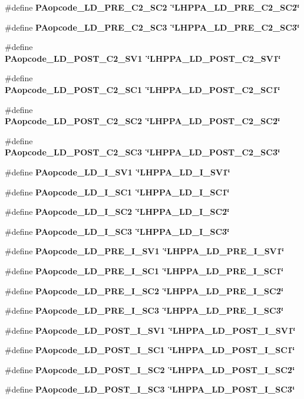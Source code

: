 \begin{CompactItemize}
\#define \bf{PAopcode\_\-LD\_\-PRE\_\-C2\_\-SC2}~\char`\"{}LHPPA\_\-LD\_\-PRE\_\-C2\_\-SC2\char`\"{}
\item 
\#define \bf{PAopcode\_\-LD\_\-PRE\_\-C2\_\-SC3}~\char`\"{}LHPPA\_\-LD\_\-PRE\_\-C2\_\-SC3\char`\"{}
\item 
\#define \bf{PAopcode\_\-LD\_\-POST\_\-C2\_\-SV1}~\char`\"{}LHPPA\_\-LD\_\-POST\_\-C2\_\-SV1\char`\"{}
\item 
\#define \bf{PAopcode\_\-LD\_\-POST\_\-C2\_\-SC1}~\char`\"{}LHPPA\_\-LD\_\-POST\_\-C2\_\-SC1\char`\"{}
\item 
\#define \bf{PAopcode\_\-LD\_\-POST\_\-C2\_\-SC2}~\char`\"{}LHPPA\_\-LD\_\-POST\_\-C2\_\-SC2\char`\"{}
\item 
\#define \bf{PAopcode\_\-LD\_\-POST\_\-C2\_\-SC3}~\char`\"{}LHPPA\_\-LD\_\-POST\_\-C2\_\-SC3\char`\"{}
\item 
\#define \bf{PAopcode\_\-LD\_\-I\_\-SV1}~\char`\"{}LHPPA\_\-LD\_\-I\_\-SV1\char`\"{}
\item 
\#define \bf{PAopcode\_\-LD\_\-I\_\-SC1}~\char`\"{}LHPPA\_\-LD\_\-I\_\-SC1\char`\"{}
\item 
\#define \bf{PAopcode\_\-LD\_\-I\_\-SC2}~\char`\"{}LHPPA\_\-LD\_\-I\_\-SC2\char`\"{}
\item 
\#define \bf{PAopcode\_\-LD\_\-I\_\-SC3}~\char`\"{}LHPPA\_\-LD\_\-I\_\-SC3\char`\"{}
\item 
\#define \bf{PAopcode\_\-LD\_\-PRE\_\-I\_\-SV1}~\char`\"{}LHPPA\_\-LD\_\-PRE\_\-I\_\-SV1\char`\"{}
\item 
\#define \bf{PAopcode\_\-LD\_\-PRE\_\-I\_\-SC1}~\char`\"{}LHPPA\_\-LD\_\-PRE\_\-I\_\-SC1\char`\"{}
\item 
\#define \bf{PAopcode\_\-LD\_\-PRE\_\-I\_\-SC2}~\char`\"{}LHPPA\_\-LD\_\-PRE\_\-I\_\-SC2\char`\"{}
\item 
\#define \bf{PAopcode\_\-LD\_\-PRE\_\-I\_\-SC3}~\char`\"{}LHPPA\_\-LD\_\-PRE\_\-I\_\-SC3\char`\"{}
\item 
\#define \bf{PAopcode\_\-LD\_\-POST\_\-I\_\-SV1}~\char`\"{}LHPPA\_\-LD\_\-POST\_\-I\_\-SV1\char`\"{}
\item 
\#define \bf{PAopcode\_\-LD\_\-POST\_\-I\_\-SC1}~\char`\"{}LHPPA\_\-LD\_\-POST\_\-I\_\-SC1\char`\"{}
\item 
\#define \bf{PAopcode\_\-LD\_\-POST\_\-I\_\-SC2}~\char`\"{}LHPPA\_\-LD\_\-POST\_\-I\_\-SC2\char`\"{}
\item 
\#define \bf{PAopcode\_\-LD\_\-POST\_\-I\_\-SC3}~\char`\"{}LHPPA\_\-LD\_\-POST\_\-I\_\-SC3\char`\"{}
\item 

\end{CompactItemize}

